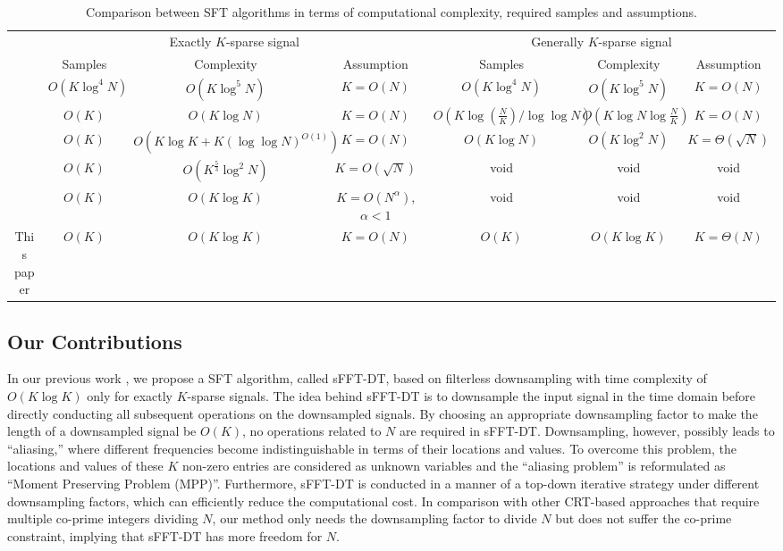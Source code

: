 \documentclass[journal,onecolumn,11pt]{IEEEtran}
\begin{document}
\begin{table}[t]
\fontsize{7.5pt}{1em}\selectfont
\centering
\setlength{\abovecaptionskip}{0pt}
\setlength{\belowcaptionskip}{4pt}
\caption{Comparison between SFT algorithms in terms of computational complexity, required samples and assumptions.}
\label{Table: SFT comparision}
\doublerulesep=0pt
\begin{tabular}[tc]{|c||c|c|c|c|c|c|}
\hline
 \multirow{2}{*}{}&    \multicolumn{3}{c|}{Exactly $K$-sparse signal}&  \multicolumn{3}{c|}{Generally $K$-sparse signal}  \\
\cline{2-7} & Samples  & Complexity & Assumption & Samples & Complexity & Assumption   \\ \hline\hline
\cite{Iwen2010}& $O(K \log^{4} N)$  &$O(K \log^{5} N)$ & $K=O(N)$ & $O(K \log^{4} N)$& $O(K \log^{5} N)$&  $K=O(N)$  \\ \hline
\cite{Haitham2012_1}& $O(K )$ & $O(K \log N)$ & $K=O(N)$ & $O(K \log(\frac{N}{K})/\log\log N )$ & $O (K \log N \log \frac{N}{K})$ &  $K=O(N)$  \\ \hline
\cite{Ghazi2013}& $O(K)$ & $O(K \log K+K(\log\log N)^{O(1)})$&  $K=O(N)$ &$O(K \log N)$ & $O(K \log^{2} N)$ & $K=\Theta(\sqrt{N})$    \\ \hline
\cite{Heider2013}& $O(K)$ & $O(K^{\frac{5}{3}} \log^{2} N)$ & $K=O(\sqrt{N})$ & void & void & void    \\ \hline
\cite{Pawar2013}& $O(K)$ & $O(K \log K)$& $K=O(N^{\alpha})$, $\alpha<1$ & void & void & void   \\ \hline
This paper& $O(K)$ & $O(K \log K)$& $K=O(N)$ & $O(K)$  & $O(K \log K)$ & $K=\Theta(N)$   \\ \hline
\end{tabular}
\end{table}

\subsection{Our Contributions}
In our previous work \cite{Hsieh2013}, we propose a SFT algorithm, called sFFT-DT, based on filterless downsampling with time complexity of $O(K \log K)$ only for exactly $K$-sparse signals.
The idea behind sFFT-DT is to downsample the input signal in the time domain before directly conducting all subsequent operations on the downsampled signals.
By choosing an appropriate downsampling factor to make the length of a downsampled signal be $O(K)$, no operations related to $N$ are required in sFFT-DT.
Downsampling, however, possibly leads to ``aliasing,'' where different frequencies become indistinguishable in terms of their locations and values.
To overcome this problem, the locations and values of these $K$ non-zero entries are considered as unknown variables and the ``aliasing problem'' is reformulated as ``Moment Preserving Problem (MPP)''.
Furthermore, sFFT-DT is conducted in a manner of a top-down iterative strategy under different downsampling factors, which can efficiently reduce the computational cost.
In comparison with other CRT-based approaches \cite{Heider2013}\cite{Pawar2013} that require multiple co-prime integers dividing $N$, our method only needs the downsampling factor to divide $N$ but does not suffer the co-prime constraint, implying that sFFT-DT has more freedom for $N$.
\end{document}
